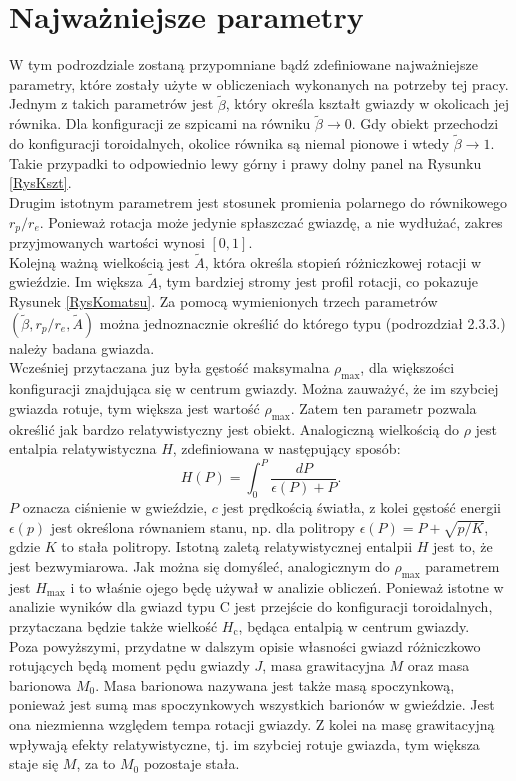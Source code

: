 \documentclass{bachelor_thesis}
\begin{document}
        \section{Najważniejsze parametry}
        W tym podrozdziale zostaną przypomniane bądź zdefiniowane najważniejsze parametry, które zostały użyte w obliczeniach wykonanych na potrzeby tej pracy. Jednym z takich parametrów jest $\tilde{\beta}$, który określa kształt gwiazdy w okolicach jej równika. Dla konfiguracji ze szpicami na równiku $\tilde{\beta}\rightarrow 0$. Gdy obiekt przechodzi do konfiguracji toroidalnych, okolice równika są niemal pionowe i wtedy $\tilde{\beta}\rightarrow 1$.  Takie przypadki to odpowiednio lewy górny i prawy dolny panel na Rysunku \ref{RysKszt}.\\
        \indent Drugim istotnym parametrem jest stosunek promienia polarnego do równikowego $r_p/r_e$. Ponieważ rotacja może jedynie spłaszczać gwiazdę, a nie wydłużać, zakres przyjmowanych wartości wynosi $[0,1]$.\\
        \indent Kolejną ważną wielkością jest $\tilde{A}$, która określa stopień różniczkowej rotacji w gwieździe. Im większa $\tilde{A}$, tym bardziej stromy jest profil rotacji, co pokazuje Rysunek \ref{RysKomatsu}. Za pomocą wymienionych trzech parametrów $(\tilde{\beta},r_p/r_e,\tilde{A})$ można jednoznacznie określić do którego typu (podrozdział 2.3.3.) należy badana gwiazda.\\
        \indent Wcześniej przytaczana juz była gęstość maksymalna $\rho_{\textrm{max}}$, dla większości konfiguracji znajdująca się w centrum gwiazdy. Można zauważyć, że im szybciej gwiazda rotuje, tym większa jest wartość $\rho_{\textrm{max}}$. Zatem ten parametr pozwala określić jak bardzo relatywistyczny jest obiekt. Analogiczną wielkością do $\rho$ jest entalpia relatywistyczna $H$, zdefiniowana w następujący sposób:
        \begin{equation}
            H(P)=\int_0^P \frac{dP}{\epsilon(P)+P}.
        \end{equation}
        $P$ oznacza ciśnienie w gwieździe, $c$ jest prędkością światła, z kolei gęstość energii $\epsilon(p)$ jest określona równaniem stanu, np. dla politropy $\epsilon(P)=P+\sqrt{p/K}$, gdzie $K$ to stała politropy. Istotną zaletą relatywistycznej entalpii $H$ jest to, że jest bezwymiarowa. Jak można się domyśleć, analogicznym do $\rho_{\textrm{max}}$ parametrem jest $H_{\textrm{max}}$ i to właśnie ojego będę używał w analizie obliczeń. Ponieważ istotne w analizie wyników dla gwiazd typu C jest przejście do konfiguracji toroidalnych, przytaczana będzie także wielkość $H_\textrm{c}$, będąca entalpią w centrum gwiazdy.\\
        \indent Poza powyższymi, przydatne w dalszym opisie własności gwiazd różniczkowo rotujących będą moment pędu gwiazdy $J$, masa grawitacyjna $M$ oraz masa barionowa $M_0$. Masa barionowa nazywana jest także masą spoczynkową, ponieważ jest sumą mas spoczynkowych wszystkich barionów w gwieździe. Jest ona niezmienna względem tempa rotacji gwiazdy. Z kolei na masę grawitacyjną wpływają efekty relatywistyczne, tj. im szybciej rotuje gwiazda, tym większa staje się $M$, za to $M_0$ pozostaje stała.
\end{document}
